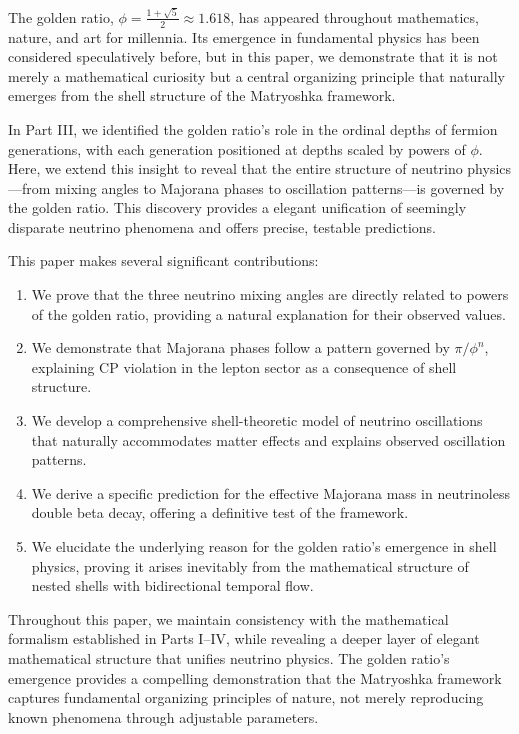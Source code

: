 \documentclass[12pt,a4paper]{article}
\begin{document}
The golden ratio, $\phi = \frac{1+\sqrt{5}}{2} \approx 1.618$, has appeared throughout mathematics, nature, and art for millennia. Its emergence in fundamental physics has been considered speculatively before, but in this paper, we demonstrate that it is not merely a mathematical curiosity but a central organizing principle that naturally emerges from the shell structure of the Matryoshka framework.

In Part III, we identified the golden ratio's role in the ordinal depths of fermion generations, with each generation positioned at depths scaled by powers of $\phi$. Here, we extend this insight to reveal that the entire structure of neutrino physics—from mixing angles to Majorana phases to oscillation patterns—is governed by the golden ratio. This discovery provides a elegant unification of seemingly disparate neutrino phenomena and offers precise, testable predictions.

This paper makes several significant contributions:

\begin{enumerate}
    \item We prove that the three neutrino mixing angles are directly related to powers of the golden ratio, providing a natural explanation for their observed values.
    
    \item We demonstrate that Majorana phases follow a pattern governed by $\pi/\phi^n$, explaining CP violation in the lepton sector as a consequence of shell structure.
    
    \item We develop a comprehensive shell-theoretic model of neutrino oscillations that naturally accommodates matter effects and explains observed oscillation patterns.
    
    \item We derive a specific prediction for the effective Majorana mass in neutrinoless double beta decay, offering a definitive test of the framework.
    
    \item We elucidate the underlying reason for the golden ratio's emergence in shell physics, proving it arises inevitably from the mathematical structure of nested shells with bidirectional temporal flow.
\end{enumerate}

Throughout this paper, we maintain consistency with the mathematical formalism established in Parts I--IV, while revealing a deeper layer of elegant mathematical structure that unifies neutrino physics. The golden ratio's emergence provides a compelling demonstration that the Matryoshka framework captures fundamental organizing principles of nature, not merely reproducing known phenomena through adjustable parameters.
\end{document}
